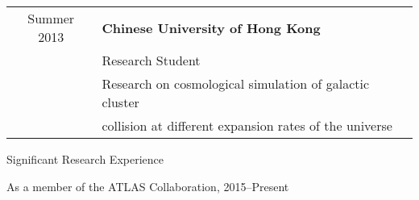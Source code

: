 \vspace{0.1in}
\hspace{0.18in}
\begin{tabular}{c|l}
   Summer 2013 & {\bf{Chinese University of Hong Kong}} \\
             & Research Student \\
             & Research on cosmological simulation of galactic cluster\\    
             & collision at different expansion rates of the universe
\end{tabular}



\vspace{0.35in}
{\Large Significant Research Experience}\\
\HRule
\vspace{0.15in}


\hspace{0.25in}
As a member of the ATLAS Collaboration, 2015--Present

